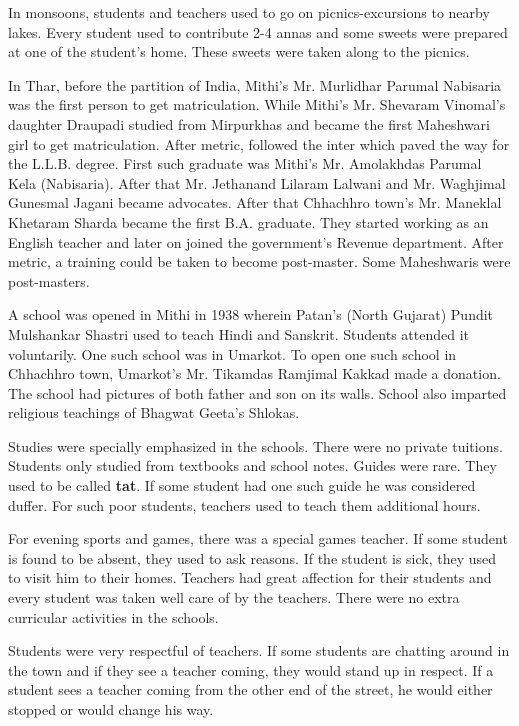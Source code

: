 In monsoons, students and teachers used to go on picnics-excursions to nearby
lakes. Every student used to contribute 2-4 annas and some sweets were prepared
at one of the student's home. These sweets were taken along to the picnics.

In Thar, before the partition of India, Mithi's Mr. Murlidhar Parumal Nabisaria
was the first person to get matriculation. While Mithi's Mr. Shevaram Vinomal's
daughter Draupadi studied from Mirpurkhas and became the first Maheshwari girl
to get matriculation. After metric, followed the inter which paved the way for
the L.L.B. degree. First such graduate was Mithi's Mr. Amolakhdas Parumal Kela
(Nabisaria). After that Mr. Jethanand Lilaram Lalwani and Mr. Waghjimal Gunesmal
Jagani became advocates. After that Chhachhro town's Mr. Maneklal Khetaram
Sharda became the first B.A. graduate. They started working as an English
teacher and later on joined the government's Revenue department. After metric, a
training could be taken to become post-master. Some Maheshwaris were
post-masters.

A school was opened in Mithi in 1938 wherein Patan's (North Gujarat) Pundit
Mulshankar Shastri used to teach Hindi and Sanskrit. Students attended it
voluntarily. One such school was in Umarkot. To open one such school in
Chhachhro town, Umarkot's Mr. Tikamdas Ramjimal Kakkad made a donation. The
school had pictures of both father and son on its walls. School also imparted
religious teachings of Bhagwat Geeta's Shlokas.

Studies were specially emphasized in the schools. There were no private tuitions.
Students only studied from textbooks and school notes. Guides were rare. They
used to be called \textbf{tat}. If some student had one such guide he was
considered duffer. For such poor students, teachers used to teach them
additional hours.

For evening sports and games, there was a special games teacher. If some student
is found to be absent, they used  to ask reasons. If the student is sick, they
used to visit him to their homes. Teachers had great affection for their
students and every student was taken well care of by the teachers. There were no
extra curricular activities in the schools.

Students were very respectful of teachers. If some students are chatting around
in the town and if they see a teacher coming, they would stand up in respect. If
a student sees a teacher coming from the other end of the street, he would either
stopped or would change his way.

